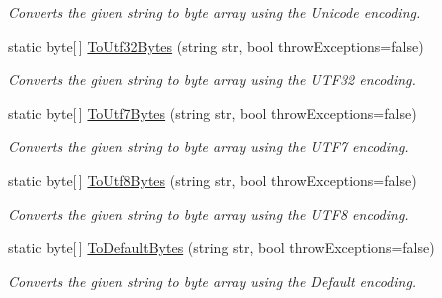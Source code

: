 \begin{DoxyCompactItemize}
\begin{DoxyCompactList}\small\item\em Converts the given string to byte array using the Unicode encoding. \end{DoxyCompactList}\item 
static byte\mbox{[}$\,$\mbox{]} \hyperlink{class_ultimate_1_1_utilities_1_1_string_utils_a55a10150ef00907c31b32c38f2f8a6f1}{To\+Utf32\+Bytes} (string str, bool throw\+Exceptions=false)
\begin{DoxyCompactList}\small\item\em Converts the given string to byte array using the U\+T\+F32 encoding. \end{DoxyCompactList}\item 
static byte\mbox{[}$\,$\mbox{]} \hyperlink{class_ultimate_1_1_utilities_1_1_string_utils_a46875902daccd58cff74cc32e428db86}{To\+Utf7\+Bytes} (string str, bool throw\+Exceptions=false)
\begin{DoxyCompactList}\small\item\em Converts the given string to byte array using the U\+T\+F7 encoding. \end{DoxyCompactList}\item 
static byte\mbox{[}$\,$\mbox{]} \hyperlink{class_ultimate_1_1_utilities_1_1_string_utils_afd7afd766f786b0dd745fd121625ebf1}{To\+Utf8\+Bytes} (string str, bool throw\+Exceptions=false)
\begin{DoxyCompactList}\small\item\em Converts the given string to byte array using the U\+T\+F8 encoding. \end{DoxyCompactList}\item 
static byte\mbox{[}$\,$\mbox{]} \hyperlink{class_ultimate_1_1_utilities_1_1_string_utils_a3f128db4715b49e07346e423aed93bb6}{To\+Default\+Bytes} (string str, bool throw\+Exceptions=false)
\begin{DoxyCompactList}\small\item\em Converts the given string to byte array using the Default encoding. \end{DoxyCompactList}\end{DoxyCompactItemize}

